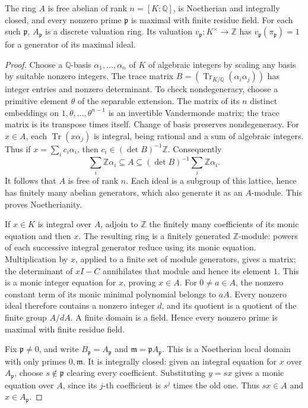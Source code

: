 \begin{lemma}\label{lem:sz-dedekind}
The ring \(A\) is free abelian of rank \(n=[K:\mathbb Q]\),
is Noetherian and integrally closed, and every nonzero prime
\(\mathfrak p\) is maximal with finite residue field.
For each such \(\mathfrak p\), \(A_{\mathfrak p}\) is a discrete
valuation ring. Its valuation \(v_{\mathfrak p}:K^\times\to\mathbb Z\)
has \(v_{\mathfrak p}(\pi_{\mathfrak p})=1\) for a generator of its
maximal ideal.
\end{lemma}
\begin{proof}
Choose a \(\mathbb Q\)-basis \(\alpha_1,\ldots,\alpha_n\) of \(K\)
of algebraic integers by scaling any basis by suitable nonzero integers.
The trace matrix
\(B=(\operatorname{Tr}_{K/\mathbb Q}(\alpha_i\alpha_j))\)
has integer entries and nonzero determinant. To check nondegeneracy,
choose a primitive element \(\theta\) of the separable extension.
The matrix of its \(n\) distinct embeddings on
\(1,\theta,\ldots,\theta^{n-1}\) is an invertible Vandermonde matrix;
the trace matrix is its transpose times itself. Change of basis
preserves nondegeneracy.
For \(x\in A\), each \(\operatorname{Tr}(x\alpha_j)\) is integral,
being rational and a sum of algebraic integers. Thus if
\(x=\sum_i c_i\alpha_i\), then
\(c_i\in(\det B)^{-1}\mathbb Z\). Consequently
\[
 \sum_i\mathbb Z\alpha_i\subseteq A
 \subseteq(\det B)^{-1}\sum_i\mathbb Z\alpha_i .
\]
It follows that \(A\) is free of rank \(n\). Each ideal is a subgroup
of this lattice, hence has finitely many abelian generators, which
also generate it as an \(A\)-module. This proves Noetherianity.

If \(x\in K\) is integral over \(A\), adjoin to \(\mathbb Z\) the
finitely many coefficients of its monic equation and then \(x\).
The resulting ring is a finitely generated \(\mathbb Z\)-module:
powers of each successive integral generator reduce using its monic
equation. Multiplication by \(x\), applied to a finite set of module
generators, gives a matrix; the determinant of \(xI-C\) annihilates
that module and hence its element \(1\). This is a monic integer
equation for \(x\), proving \(x\in A\).
For \(0\ne a\in A\), the nonzero constant term of its monic minimal
polynomial belongs to \(aA\). Every nonzero ideal therefore contains
a nonzero integer \(d\), and its quotient is a quotient of the finite
group \(A/dA\). A finite domain is a field. Hence every nonzero prime
is maximal with finite residue field.

Fix \(\mathfrak p\ne0\), and write \(B_{\mathfrak p}=A_{\mathfrak p}\)
and \(\mathfrak m=\mathfrak p A_{\mathfrak p}\).
This is a Noetherian local domain with only primes \(0,\mathfrak m\).
It is integrally closed: given an integral equation for \(x\) over
\(A_{\mathfrak p}\), choose \(s\notin\mathfrak p\) clearing every
coefficient. Substituting \(y=sx\) gives a monic equation over \(A\),
since its \(j\)-th coefficient is \(s^j\) times the old one. Thus
\(sx\in A\) and \(x\in A_{\mathfrak p}\).


\end{proof}
